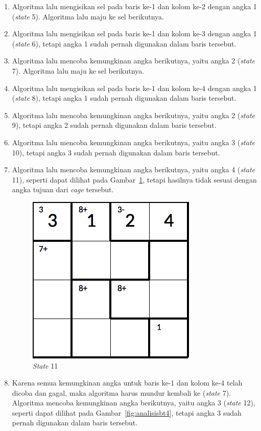 \begin{enumerate}
\item Algoritma lalu mengisikan sel pada baris ke-1 dan kolom ke-2 dengan angka 1 (\textit{state} 5). Algoritma lalu maju ke sel berikutnya.
\item Algoritma lalu mengisikan sel pada baris ke-1 dan kolom ke-3 dengan angka 1 (\textit{state} 6), tetapi angka 1 sudah pernah digunakan dalam baris tersebut.
\item Algoritma lalu mencoba kemungkinan angka berikutnya, yaitu angka 2 (\textit{state} 7). Algoritma lalu maju ke sel berikutnya.
\item Algoritma lalu mengisikan sel pada baris ke-1 dan kolom ke-4 dengan angka 1 (\textit{state} 8), tetapi angka 1 sudah pernah digunakan dalam baris tersebut.
\item Algoritma lalu mencoba kemungkinan angka berikutnya, yaitu angka 2 (\textit{state} 9), tetapi angka 2 sudah pernah digunakan dalam baris tersebut.
\item Algoritma lalu mencoba kemungkinan angka berikutnya, yaitu angka 3 (\textit{state} 10), tetapi angka 3 sudah pernah digunakan dalam baris tersebut.
\item Algoritma lalu mencoba kemungkinan angka berikutnya, yaitu angka 4 (\textit{state} 11), seperti dapat dilihat pada Gambar~\ref{fig:analisisbt3}, tetapi hasilnya tidak sesuai dengan angka tujuan dari \textit{cage} tersebut.

\begin{figure}
\centering
\captionsetup{justification=centering}
\includegraphics[scale=0.333]{Gambar/backtracking/State11}
\caption[\textit{State} 11]{\textit{State} 11}
\label{fig:analisisbt3}
\end{figure}

\item Karena semua kemungkinan angka untuk baris ke-1 dan kolom ke-4 telah dicoba dan gagal, maka algoritma harus mundur kembali ke (\textit{state} 7). Algoritma mencoba kemungkinan angka berikutnya, yaitu angka 3  (\textit{state} 12), seperti dapat dilihat pada Gambar~\ref{fig:analisisbt4}, tetapi angka 3 sudah pernah digunakan dalam baris tersebut.


\end{enumerate}
